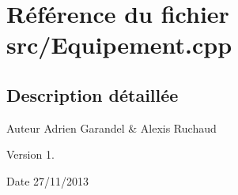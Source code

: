 \section{Référence du fichier src/\-Equipement.cpp}
\label{_equipement_8cpp}


\subsection{Description détaillée}
\begin{DoxyAuthor}{Auteur}
Adrien Garandel \& Alexis Ruchaud 
\end{DoxyAuthor}
\begin{DoxyVersion}{Version}
1. 
\end{DoxyVersion}
\begin{DoxyDate}{Date}
27/11/2013 
\end{DoxyDate}
